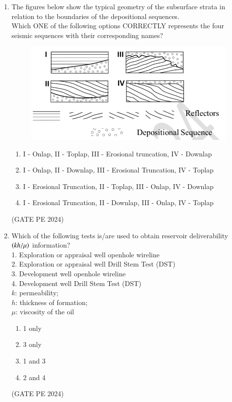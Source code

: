 \documentclass[journal,12pt,onecolumn]{IEEEtran}
\theoremstyle{remark}
\begin{document}
\begin{enumerate}
\item The figures below show the typical geometry of the subsurface strata in relation to the boundaries of the depositional sequences.\\
Which ONE of the following options CORRECTLY represents the four seismic sequences with their corresponding names?
\begin{figure}[H]
    \centering
    \includegraphics[width=0.5\columnwidth]{LQ_43.png}
    \caption{}
    \label{fig:placeholder}
\end{figure}
\begin{enumerate}
    \item I - Onlap, II - Toplap, III - Erosional truncation, IV - Downlap
    \item I - Onlap, II - Downlap, III - Erosional Truncation, IV - Toplap
    \item I - Erosional Truncation, II - Toplap, III - Onlap, IV - Downlap
    \item I - Erosional Truncation, II - Downlap, III - Onlap, IV - Toplap
\end{enumerate}
\hfill{(GATE PE 2024)}

\item Which of the following tests is/are used to obtain reservoir deliverability $\left(kh/\mu\right)$ information?\\
1. Exploration or appraisal well openhole wireline\\
2. Exploration or appraisal well Drill Stem Test (DST)\\
3. Development well openhole wireline\\
4. Development well Drill Stem Test (DST)\\
$k$: permeability;\\
$h$: thickness of formation;\\
$\mu$: viscosity of the oil
\begin{enumerate}
    \item 1 only
    \item 3 only
    \item 1 and 3
    \item 2 and 4
\end{enumerate}
\hfill{(GATE PE 2024)}


\end{enumerate}
\end{document}

